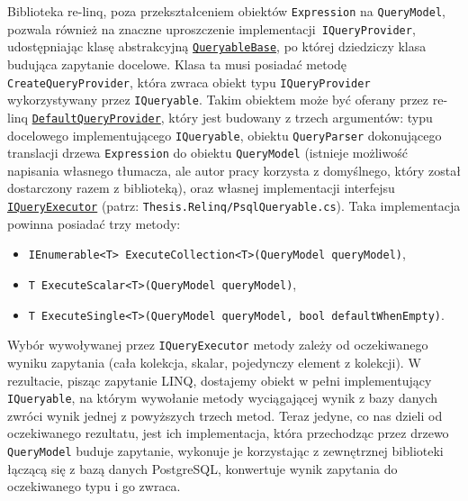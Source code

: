 Biblioteka re-linq, poza przekształceniem obiektów \texttt{Expression} na \texttt{QueryModel}, pozwala również na znaczne uproszczenie implementacji \texttt{IQueryProvider}, udostępniając klasę abstrakcyjną \href{https://github.com/re-motion/Relinq/blob/82fdca6a4bfd942bb4a71dd20ab9c5af0aea0541/Core/QueryableBase.cs}{\texttt{QueryableBase}}, po której dziedziczy klasa budująca zapytanie docelowe. Klasa ta musi posiadać metodę \texttt{CreateQueryProvider}, która zwraca obiekt typu \texttt{IQueryProvider} wykorzystywany przez \texttt{IQueryable}. Takim obiektem może być oferany przez re-linq \href{https://github.com/re-motion/Relinq/blob/82fdca6a4bfd942bb4a71dd20ab9c5af0aea0541/Core/DefaultQueryProvider.cs}{\texttt{DefaultQueryProvider}}, który jest budowany z trzech argumentów: typu docelowego implementującego \texttt{IQueryable}, obiektu \texttt{QueryParser} dokonującego translacji drzewa \texttt{Expression} do obiektu \texttt{QueryModel} (istnieje możliwość napisania własnego tłumacza, ale autor pracy korzysta z domyślnego, który został dostarczony razem z biblioteką), oraz własnej implementacji interfejsu \href{https://github.com/re-motion/Relinq/blob/82fdca6a4bfd942bb4a71dd20ab9c5af0aea0541/Core/IQueryExecutor.cs}{\texttt{IQueryExecutor}} (patrz: \texttt{Thesis.Relinq/PsqlQueryable.cs}). Taka implementacja powinna posiadać trzy metody:

\begin{itemize}
\item \texttt{IEnumerable<T> ExecuteCollection<T>(QueryModel queryModel)},
\item \texttt{T ExecuteScalar<T>(QueryModel queryModel)},
\item \texttt{T ExecuteSingle<T>(QueryModel queryModel, bool defaultWhenEmpty)}.
\end{itemize}

Wybór wywoływanej przez \texttt{IQueryExecutor} metody zależy od oczekiwanego wyniku zapytania (cała kolekcja, skalar, pojedynczy element z kolekcji). W rezultacie, pisząc zapytanie LINQ, dostajemy obiekt w pełni implementujący \texttt{IQueryable}, na którym wywołanie metody wyciągającej wynik z bazy danych zwróci wynik jednej z powyższych trzech metod. Teraz jedyne, co nas dzieli od oczekiwanego rezultatu, jest ich implementacja, która przechodząc przez drzewo \texttt{QueryModel} buduje zapytanie, wykonuje je korzystając z zewnętrznej biblioteki łączącą się z bazą danych PostgreSQL, konwertuje wynik zapytania do oczekiwanego typu i go zwraca.

